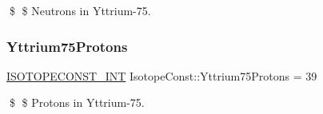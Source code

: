 \$ \$ Neutrons in Yttrium-\/75. \mbox{\label{group___isotope_const-_yttrium-_y75_gaa92f5947f78b4156e7c1ebfcf6c304c6}} 
\subsubsection{\texorpdfstring{Yttrium75\+Protons}{Yttrium75Protons}}
{\footnotesize\ttfamily \mbox{\hyperlink{group___isotope_const-_macros_ga5f18360b3e99483a35c32d789e62621c}{I\+S\+O\+T\+O\+P\+E\+C\+O\+N\+S\+T\+\_\+\+I\+NT}} Isotope\+Const\+::\+Yttrium75\+Protons = 39}

\$ \$ Protons in Yttrium-\/75. 